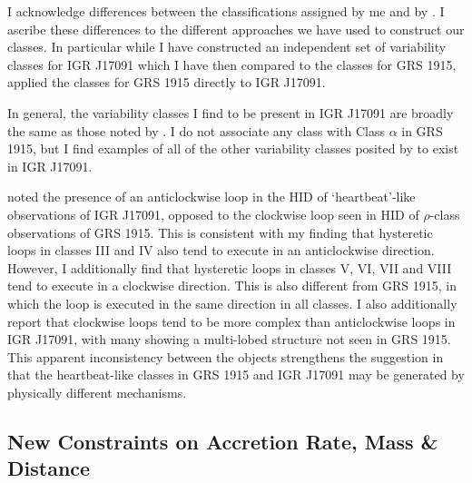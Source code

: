 \par I acknowledge differences between the classifications assigned by me and by \citet{Altamirano_IGR_FH}.  I ascribe these differences to the different approaches we have used to construct our classes.  In particular while I have constructed an independent set of variability classes for IGR J17091 which I have then compared to the \citeauthor{Belloni_GRS_MI} classes for GRS 1915, \citeauthor{Altamirano_IGR_FH} applied the \citeauthor{Belloni_GRS_MI} classes for GRS 1915 directly to IGR J17091.
\par In general, the variability classes I find to be present in IGR J17091 are broadly the same as those noted by \citet{Altamirano_IGR_FH}.  I do not associate any class with Class $\alpha$ in GRS 1915, but I find examples of all of the other variability classes posited by \citeauthor{Altamirano_IGR_FH} to exist in IGR J17091.
\par \citealp{Altamirano_IGR_FH} noted the presence of an anticlockwise loop in the HID of `heartbeat'-like observations of IGR J17091, opposed to the clockwise loop seen in HID of $\rho$-class observations of GRS 1915.  This is consistent with my finding that hysteretic loops in classes III and IV also tend to execute in an anticlockwise direction.  However, I additionally find that hysteretic loops in classes V, VI, VII and VIII tend to execute in a clockwise direction.  This is also different from GRS 1915, in which the loop is executed in the same direction in all classes.  I also additionally report that clockwise loops tend to be more complex than anticlockwise loops in IGR J17091, with many showing a multi-lobed structure not seen in GRS 1915.  This apparent inconsistency between the objects strengthens the suggestion in \citealp{Altamirano_IGR_FH} that the heartbeat-like classes in GRS 1915 and IGR J17091 may be generated by physically different mechanisms.

\subsection{New Constraints on Accretion Rate, Mass \& Distance}
\label{sec:newmass}

